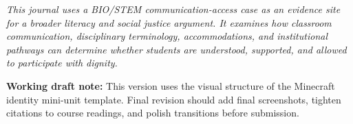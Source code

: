 \begin{titlepage}
\vspace{0.34in}

\begin{center}
\begin{minipage}{0.86\textwidth}
\itshape
This journal uses a BIO/STEM communication-access case as an evidence site for a broader literacy and social justice argument. It examines how classroom communication, disciplinary terminology, accommodations, and institutional pathways can determine whether students are understood, supported, and allowed to participate with dignity.

\vspace{0.22in}

\scriptsize\centering\textbf{Working draft note:} This version uses the visual structure of the Minecraft identity mini-unit template. Final revision should add final screenshots, tighten citations to course readings, and polish transitions before submission.
\end{minipage}
\end{center}

\restoregeometry
\end{titlepage}
\clearpage
\onehalfspacing
